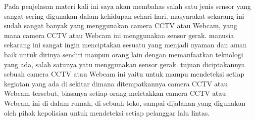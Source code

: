 Pada penjelasan materi kali ini saya akan membahas salah satu jenis sensor yang sangat sering digunakan dalam 
kehidupan sehari-hari, masyarakat sekarang ini sudah sangat banyak yang menggunakan camera CCTV atau Webcam, yang mana camera CCTV atau Webcam ini menggunakan sensor gerak. manusia sekarang ini sangat ingin menciptakan sesuatu yang menjadi nyaman dan aman baik untuk dirinya sendiri maupun orang lain dengan memanfaatkan teknologi yang ada, salah satunya yatu menggunakan sensor gerak. tujuan diciptakannya sebuah camera CCTV atau Webcam ini yaitu untuk mampu mendeteksi setiap kegiatan yang ada di sekitar dimana ditempatkannya camera CCTV atau Webcam tersebut, biasanya setiap orang meletakkan camera CCTV atau Webcam ini di dalam rumah, di sebuah toko, sampai dijalanan yang digunakan oleh pihak kepolisian untuk mendeteksi setiap pelanggar lalu lintas.

